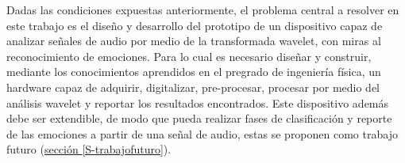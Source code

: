 \documentclass[11pt,lettersize]{article} %
\newcommand{\seccion}[1]{\hyperref[{#1}]{sección \ref*{#1}}}
\begin{document}
%
%


Dadas las condiciones expuestas anteriormente, el problema central a resolver en este trabajo es el diseño y desarrollo del prototipo de un dispositivo capaz de analizar señales de audio por medio de la transformada wavelet, con miras al reconocimiento de emociones. Para lo cual es necesario diseñar y construir, mediante los conocimientos aprendidos en el pregrado de ingeniería física, un hardware capaz de adquirir, digitalizar, pre-procesar, procesar por medio del análisis wavelet y reportar los resultados encontrados. Este dispositivo además debe ser extendible, de modo que pueda realizar fases de clasificación y reporte de las emociones a partir de una señal de audio, estas se proponen como trabajo futuro (\seccion{S-trabajofuturo}).
\end{document}

